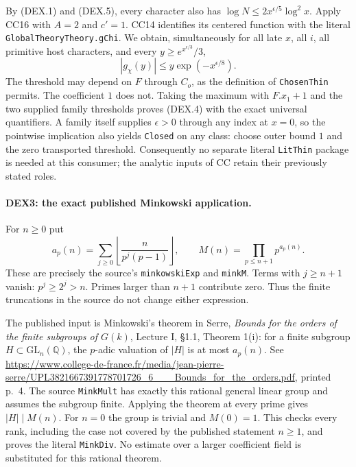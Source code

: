 \documentclass[11pt,a4paper]{article}
\numberwithin{equation}{section}
\theoremstyle{remark}\newtheorem{remark}[theorem]{Remark}
\begin{document}
By (DEX.1) and (DEX.5), every character also has
$\log N\le2x^{\epsilon/5}\log^2x$. Apply CC16 with $A=2$ and $c'=1$.
CC14 identifies its centered function with the literal
\texttt{GlobalTheoryTheory.gChi}. We obtain, simultaneously for all
late $x$, all $i$, all primitive host characters, and every
$y\ge e^{x^{\epsilon/3}}/3$,
\[
             |g_\chi(y)|\le y\exp(-x^{\epsilon/8}).        \tag{DEX.6}
\]
The threshold may depend on $F$ through $C_o$, as the definition of
\texttt{ChosenThin} permits. The coefficient $1$ does not. Taking the
maximum with $F.x_1+1$ and the two supplied family thresholds proves
(DEX.4) with the exact universal quantifiers. A family itself supplies
$\epsilon>0$ through any index at $x=0$, so the pointwise implication
also yields \texttt{Closed} on any class: choose outer bound $1$ and
the zero transported threshold. Consequently no separate literal
\texttt{LitThin} package is needed at this consumer; the analytic inputs
of CC retain their previously stated roles.

\paragraph{DEX3: the exact published Minkowski application.}
\label{claim:DEX3}
For $n\ge0$ put
\[
 a_p(n)=\sum_{j\ge0}\left\lfloor\frac{n}{p^j(p-1)}\right\rfloor,
 \qquad M(n)=\prod_{p\le n+1}p^{a_p(n)}.                  \tag{DEX.7}
\]
These are precisely the source's \texttt{minkowskiExp} and
\texttt{minkM}. Terms with $j\ge n+1$ vanish: $p^j\ge2^j>n$.
Primes larger than $n+1$ contribute zero. Thus the finite truncations
in the source do not change either expression.

The published input is Minkowski's theorem in Serre,
\emph{Bounds for the orders of the finite subgroups of $G(k)$},
Lecture I, \S1.1, Theorem 1(i): for a finite subgroup
$H\subset\mathrm{GL}_n(\mathbb Q)$, the $p$-adic valuation of $|H|$
is at most $a_p(n)$. See
\url{https://www.college-de-france.fr/media/jean-pierre-serre/UPL3821667391778701726_6___Bounds_for_the_orders.pdf},
printed p.~4. The source \texttt{MinkMult} has exactly this rational
general linear group and assumes the subgroup finite. Applying the
theorem at every prime gives $|H|\mid M(n)$. For $n=0$ the group is
trivial and $M(0)=1$. This checks every rank, including the case not
covered by the published statement $n\ge1$, and proves the literal
\texttt{MinkDiv}. No estimate over a larger coefficient field is
substituted for this rational theorem.
\end{document}
